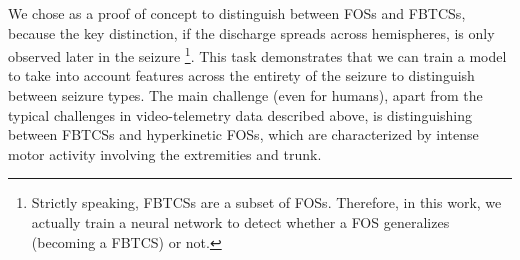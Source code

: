 We chose as a proof of concept to distinguish between \acp{FOS} and \acp{FBTCS}, because the key distinction, if the discharge spreads across hemispheres, is only observed later in the seizure%
\footnote{Strictly speaking, \acp{FBTCS} are a subset of \acp{FOS}. Therefore, in this work, we actually train a neural network to detect whether a \ac{FOS} generalizes (becoming a \ac{FBTCS}) or not.}.
This task demonstrates that we can train a model to take into account features across the entirety of the seizure to distinguish between seizure types.
The main challenge (even for humans), apart from the typical challenges in video-telemetry data described above, is distinguishing between \acp{FBTCS} and hyperkinetic \acp{FOS}, which are characterized by intense motor activity involving the extremities and trunk.
